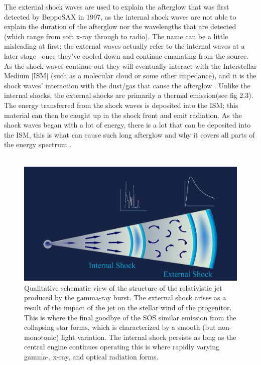 The external shock waves are used to explain the afterglow that was first detected by BeppoSAX in 1997, as the internal shock waves are not able to explain the duration of the afterglow nor the wavelengths that are detected (which range from soft x-ray through to radio). The name can be a little misleading at first; the external waves actually refer to the internal waves at a later stage --once they've cooled down and continue emanating from the source. As the shock waves continue out they will eventually interact with the Interstellar Medium [ISM] (such as a molecular cloud or some other impedance), and it is the shock waves' interaction with the dust/gas that cause the afterglow . Unlike the internal shocks, the external shocks are primarily a thermal emission(see fig 2.3). The energy transferred from the shock waves is deposited into the ISM; this material can then be caught up in the shock front and emit radiation. As the shock waves began with a lot of energy, there is a lot that can be deposited into the ISM, this is what can cause such long afterglow and why it covers all parts of the energy spectrum \citep{19}.\\\\
\begin{figure}[h]
\begin{center}
\includegraphics[scale=0.3]{Figures/fig7.png}
\caption{Qualitative schematic view of the structure of the relativistic jet produced by the gamma-ray burst. The external
shock arises as a result of the impact of the jet on the stellar wind of the progenitor. This is where the final goodbye of the SOS
similar emission from the collapsing star forms, which is characterized by a smooth (but non-monotonic) light variation. The
internal shock persists as long as the central engine continues operating this is where rapidly varying gamma-, x-ray, and
optical radiation forms.}
\end{center}
\end{figure}

